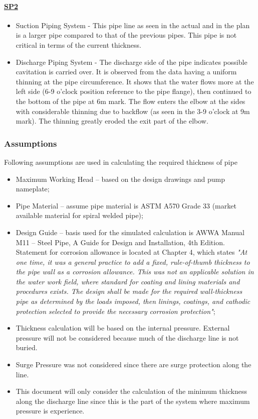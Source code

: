 \paragraph{\underline{SP2}}
\begin{itemize}
	\item Suction Piping System - This pipe line as seen in the actual and in the plan is a larger pipe compared to that of the previous pipes. This pipe is not critical in terms of the current thickness.
	\item	Discharge Piping System - The discharge side of the pipe indicates possible cavitation is carried over. It is observed from the data having a uniform thinning at the pipe circumference. It shows that the water flows more at the left side (6-9 o'clock position reference to the pipe flange), then continued to the bottom of the pipe at 6m mark. The flow enters the elbow at the sides with considerable thinning due to backflow (as seen in the 3-9 o'clock at 9m mark). The thinning greatly eroded the exit part of the elbow.
\end{itemize}



\subsubsection{Assumptions}
Following assumptions are used in calculating the required thickness of pipe
\begin{itemize}
\item Maximum Working Head – based on the design drawings and pump nameplate;
\item Pipe Material – assume pipe material is ASTM A570 Grade 33 (market available material for spiral welded pipe);
\item Design Guide – basis used for the simulated calculation is AWWA  Manual M11 – Steel Pipe, A Guide for Design and Installation, 4th Edition. Statement for corrosion allowance is located at Chapter 4, which states \textit{"At one time, it was a general practice to add a fixed, rule-of-thumb thickness to the pipe wall as a corrosion allowance. This was not an applicable solution in the water work field, where standard for coating and lining materials and procedures exists. The design shall be made for the required wall-thickness pipe as determined by the loads imposed, then linings, coatings, and cathodic protection selected to provide the necessary corrosion protection"};
\item Thickness calculation will be based on the internal pressure. External pressure will not be considered because much of the discharge line is not buried.
\item 	Surge Pressure was not considered since there are surge protection along the line. 
\item 	This document will only consider the calculation of the minimum thickness along the discharge line since this is the part of the system where maximum pressure is experience.
\end{itemize}

